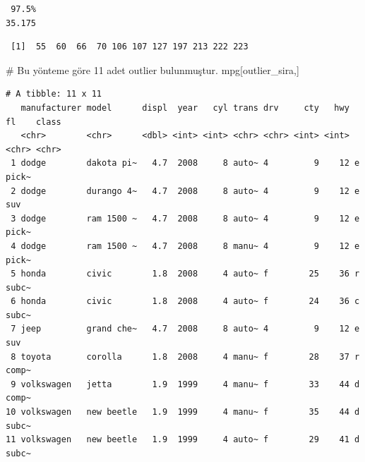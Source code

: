 \documentclass[
  letterpaper,
  DIV=11,
  numbers=noendperiod]{scrreprt}
\newenvironment{Shaded}{\begin{snugshade}}{\end{snugshade}}
\newcommand{\CommentTok}[1]{\textcolor[rgb]{0.37,0.37,0.37}{#1}}
\newcommand{\FunctionTok}[1]{\textcolor[rgb]{0.28,0.35,0.67}{#1}}
\newcommand{\NormalTok}[1]{\textcolor[rgb]{0.00,0.23,0.31}{#1}}
\newcommand{\OtherTok}[1]{\textcolor[rgb]{0.00,0.23,0.31}{#1}}
\newcommand{\SpecialCharTok}[1]{\textcolor[rgb]{0.37,0.37,0.37}{#1}}
\begin{document}
\begin{verbatim}
 97.5% 
35.175 
\end{verbatim}

\begin{Shaded}
\end{Shaded}

\begin{verbatim}
 [1]  55  60  66  70 106 107 127 197 213 222 223
\end{verbatim}

\begin{Shaded}
\begin{Highlighting}[]
\CommentTok{\# Bu yönteme göre 11 adet outlier bulunmuştur.}
\NormalTok{mpg[outlier\_sira,]}
\end{Highlighting}
\end{Shaded}

\begin{verbatim}
# A tibble: 11 x 11
   manufacturer model      displ  year   cyl trans drv     cty   hwy fl    class
   <chr>        <chr>      <dbl> <int> <int> <chr> <chr> <int> <int> <chr> <chr>
 1 dodge        dakota pi~   4.7  2008     8 auto~ 4         9    12 e     pick~
 2 dodge        durango 4~   4.7  2008     8 auto~ 4         9    12 e     suv  
 3 dodge        ram 1500 ~   4.7  2008     8 auto~ 4         9    12 e     pick~
 4 dodge        ram 1500 ~   4.7  2008     8 manu~ 4         9    12 e     pick~
 5 honda        civic        1.8  2008     4 auto~ f        25    36 r     subc~
 6 honda        civic        1.8  2008     4 auto~ f        24    36 c     subc~
 7 jeep         grand che~   4.7  2008     8 auto~ 4         9    12 e     suv  
 8 toyota       corolla      1.8  2008     4 manu~ f        28    37 r     comp~
 9 volkswagen   jetta        1.9  1999     4 manu~ f        33    44 d     comp~
10 volkswagen   new beetle   1.9  1999     4 manu~ f        35    44 d     subc~
11 volkswagen   new beetle   1.9  1999     4 auto~ f        29    41 d     subc~
\end{verbatim}
\end{document}
